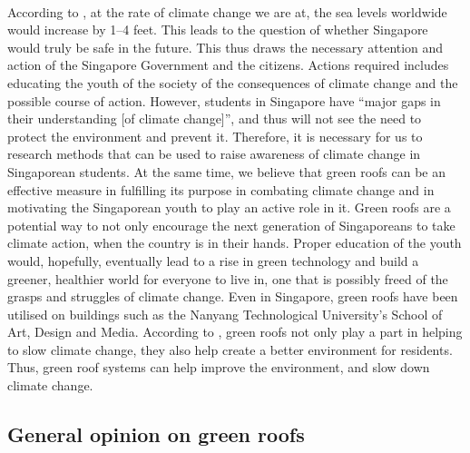 \documentclass[a4paper]{article}
\begin{document}
\begin{multicols}{2}
  \paragraph{} According to \textcite{nasa}, at the rate of climate
  change we are at, the sea levels worldwide would increase by 1--4
  feet. This leads to the question of whether Singapore would truly
  be safe in the future. This thus draws the necessary attention and
  action of the Singapore Government and the citizens. Actions required
  includes educating the youth of the society of the consequences of
  climate change and the possible course of action. However, students
  in Singapore have ``major gaps in their understanding [of climate
  change]''\parencite{student_carbon_footprint}, and thus will not
  see the need to protect the environment and prevent it. Therefore,
  it is necessary for us to research methods that can be used to raise
  awareness of climate change in Singaporean students. At the same
  time, we believe that green roofs can be an effective measure in
  fulfilling its purpose in combating climate change and in motivating
  the Singaporean youth to play an active role in it. Green roofs are a
  potential way to not only encourage the next generation of Singaporeans
  to take climate action,  when the country is in their hands. Proper
  education of the youth would, hopefully, eventually lead to a rise
  in green technology and build a greener, healthier world for everyone
  to live in, one that is possibly freed of the grasps and struggles of
  climate change. Even in Singapore, green roofs have been utilised on
  buildings such as the Nanyang Technological University's School of Art,
  Design and Media. According to \textcite{greenbuild_advant1}, green roofs
  not only play a part in helping to slow climate change, they also help
  create a better environment for residents. Thus, green roof systems
  can help improve the environment, and slow down climate change.




  \subsection{General opinion on green roofs} \label{ssec:gropt}

\end{multicols}
\end{document}
